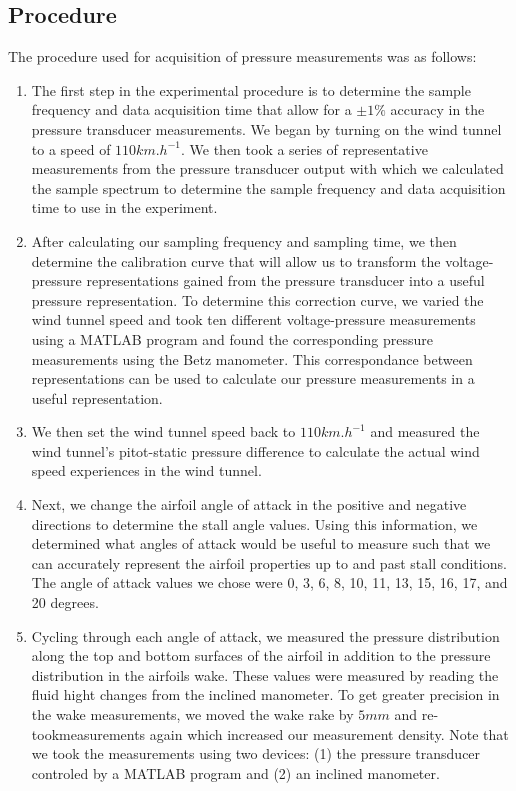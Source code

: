 \documentclass[runningheads]{llncs}
\begin{document}
\subsection{Procedure}


The procedure used for acquisition of pressure measurements was as follows:

\begin{enumerate}

    \item The first step in the experimental procedure is to determine the sample frequency and data acquisition time that allow for a $\pm 1\%$ accuracy in the pressure transducer measurements. We began by turning on the wind tunnel to a speed of $110\si{km}.\si{h}^{-1}$. We then took a series of representative measurements from the pressure transducer output with which we calculated the sample spectrum to determine the sample frequency and data acquisition time to use in the experiment.
    
    \item After calculating our sampling frequency and sampling time, we then determine the calibration curve that will allow us to transform the voltage-pressure representations gained from the pressure transducer into a useful pressure representation. To determine this correction curve, we varied the wind tunnel speed and took ten different voltage-pressure measurements using a MATLAB program and found the corresponding pressure measurements using the Betz manometer. This correspondance between representations can be used to calculate our pressure measurements in a useful representation.
    
    \item We then set the wind tunnel speed back to $110\si{km}.\si{h}^{-1}$ and measured the wind tunnel's pitot-static pressure difference to calculate the actual wind speed experiences in the wind tunnel.
    
    \item Next, we change the airfoil angle of attack in the positive and negative directions to determine the stall angle values. Using this information, we determined what angles of attack would be useful to measure such that we can accurately represent the airfoil properties up to and past stall conditions. The angle of attack values we chose were 0, 3, 6, 8, 10, 11, 13, 15, 16, 17, and 20 degrees.

    \item Cycling through each angle of attack, we measured the pressure distribution along the top and bottom surfaces of the airfoil in addition to the pressure distribution in the airfoils wake. These values were measured by reading the fluid hight changes from the inclined manometer. To get greater precision in the wake measurements, we moved the wake rake by $5\si{mm}$ and re-tookmeasurements again which increased our measurement density. Note that we took the measurements using two devices: (1) the pressure transducer controled by a MATLAB program and (2) an inclined manometer.

\end{enumerate}
\end{document}
